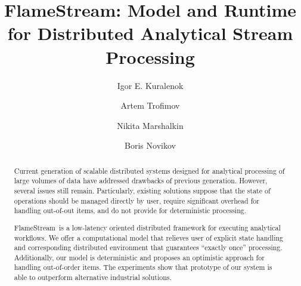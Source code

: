 \documentclass[sigconf]{acmart}
\theoremstyle{remark}
\newcommand {\FlameStream} {FlameStream}
\begin{document}
\title {\FlameStream: Model and Runtime for Distributed Analytical Stream Processing}


\author{Igor E. Kuralenok}

\author{Artem Trofimov}

\author{Nikita Marshalkin}

\author{Boris Novikov}




\begin{abstract}
Current generation of scalable distributed systems designed for analytical processing of large volumes of data have addressed drawbacks of previous generation. However, several issues still remain. Particularly, existing solutions suppose that the state of operations should be managed directly by user, require significant overhead for handling out-of-out items, and do not provide for deterministic processing.

\FlameStream\ is a low-latency oriented distributed framework for executing analytical workflows. We offer a computational model that relieves user of explicit state handling and corresponding distributed environment that guarantees ``exactly once'' processing. Additionally, our model is deterministic and proposes an optimistic approach for handling out-of-order items. The experiments show that prototype of our system is able to outperform alternative industrial solutions.
\end {abstract}
\end{document}
